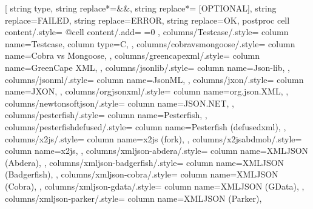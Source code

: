 \usepackage{colortbl}
\usepackage{makecell}
\usepackage{booktabs}
\usepackage{threeparttable}
\usepackage{pifont}
\newcommand{\cmark}{\ding{51}}%
\newcommand{\xmark}{\ding{55}}%
\usepackage[T1]{fontenc}
\usepackage{rubfonts2009}

  \begin{threeparttable}
\setlength{\tabcolsep}{1.25mm}
\pgfplotstabletypeset[
    string type,
    string replace*={&}{\&},
    string replace*={ [OPTIONAL]}{},
    string replace={FAILED}{},
    string replace={ERROR}{\xmark},
    string replace={OK}{\cmark},
    postproc cell content/.style={%
        @cell content/.add={
            \ifnum{}=0
                \color{white}
            \fi
           }{}
    },
    columns/Testcase/.style={
        column name=Testcase,
        column type={C},
    },
    columns/cobravsmongoose/.style={
        column name={Cobra vs Mongoose},
    },
    columns/greencapexml/.style={
        column name={GreenCape XML},
    },
    columns/jsonlib/.style={
        column name={Json-lib},
    },
    columns/jsonml/.style={
        column name={JsonML},
    },
    columns/jxon/.style={
        column name={JXON},
    },
    columns/orgjsonxml/.style={
        column name={org.json.XML},
    },
    columns/newtonsoftjson/.style={
        column name={JSON.NET},
    },
    columns/pesterfish/.style={
        column name={Pesterfish},
    },
    columns/pesterfishdefused/.style={
        column name={Pesterfish (defusedxml)},
    },
    columns/x2js/.style={
        column name={x2js (fork)},
    },
    columns/x2jsabdmob/.style={
        column name=x2js,
    },
    columns/xmljson-abdera/.style={
        column name=XMLJSON (Abdera),
    },
    columns/xmljson-badgerfish/.style={
        column name=XMLJSON (Badgerfish),
    },
    columns/xmljson-cobra/.style={
        column name=XMLJSON (Cobra),
    },
    columns/xmljson-gdata/.style={
        column name=XMLJSON (GData),
    },
    columns/xmljson-parker/.style={
        column name=XMLJSON (Parker),
}
\end{threeparttable}
